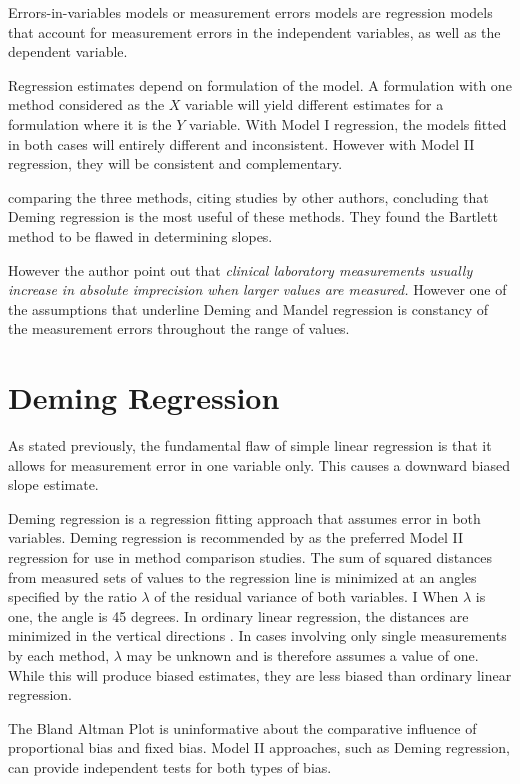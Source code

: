 \documentclass[12pt, a4paper]{report}
\theoremstyle{plain}
\theoremstyle{definition}
\theoremstyle{remark}
\begin{document}
Errors-in-variables models or measurement errors models are regression models that account for measurement errors in the independent variables, as well as the dependent variable.


Regression estimates depend on formulation of the model. A
formulation with one method considered as the $X$ variable will
yield different estimates for a formulation where it is the $Y$
variable. With Model I regression, the models fitted in both cases
will entirely different and inconsistent. However with Model II
regression, they will be consistent and complementary.

\citet{CornCoch} comparing the three methods, citing studies by other authors, concluding that Deming regression is the most useful of these methods. They found the Bartlett method to be
flawed in determining slopes.

However the author point out that \emph{ clinical laboratory measurements usually increase in absolute imprecision when larger values are measured.} However one of the assumptions that underline Deming and Mandel regression is constancy of the measurement errors throughout the range of values.





	\section{Deming Regression}
	
	As stated previously, the fundamental flaw of simple linear regression is that it allows for measurement error in one variable only. This causes a downward biased slope estimate.
	
	Deming regression is a regression fitting approach that assumes error in both variables. Deming regression is recommended by \citet*{CornCoch} as the
	preferred Model II regression for use in method comparison studies.
	The sum of squared distances from measured sets of values to the regression line is minimized at an angles specified by the ratio $\lambda$ of the residual variance of both variables. I
	When $\lambda$ is one, the angle is 45 degrees. In ordinary linear regression, the distances are minimized in the vertical directions \citep{linnet99}.
	In cases involving only single measurements by each method, $\lambda$ may be unknown and is therefore assumes a value of one. While this will produce biased estimates, they are less biased than ordinary linear regression.
	
	The Bland Altman Plot is uninformative about the comparative influence of proportional bias and fixed bias. Model II approaches, such as Deming regression,  can provide independent tests for
	both types of bias.
\end{document}
